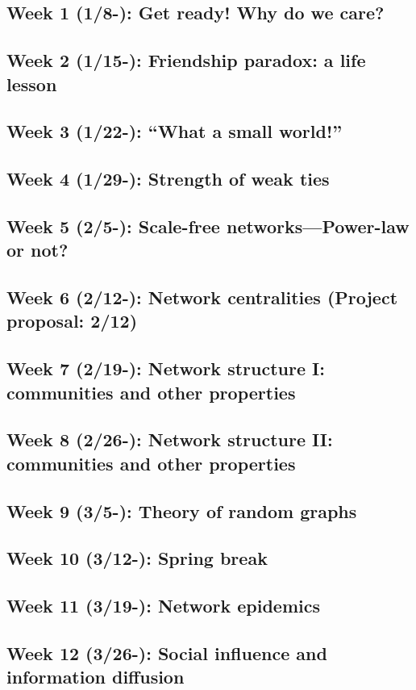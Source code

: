 \documentclass[11pt,article,oneside]{memoir} %
\begin{document}
\subsection{Week 1 (1/8-):  Get ready! Why do we care?}
\subsection{Week 2 (1/15-):  Friendship paradox: a life lesson}
\subsection{Week 3 (1/22-):  ``What a small world!''}
\subsection{Week 4 (1/29-):  Strength of weak ties}
\subsection{Week 5 (2/5-):  Scale-free networks---Power-law or not?} 
\subsection{Week 6 (2/12-):  Network centralities (Project proposal: 2/12)}
\subsection{Week 7 (2/19-):  Network structure I: communities and other properties} 
\subsection{Week 8 (2/26-):  Network structure II: communities and other properties}
\subsection{Week 9 (3/5-):  Theory of random graphs}

\subsection{\color{gray}Week 10 (3/12-): Spring break}

\subsection{Week 11 (3/19-): Network epidemics}
\subsection{Week 12 (3/26-): Social influence and information diffusion}
\end{document}
